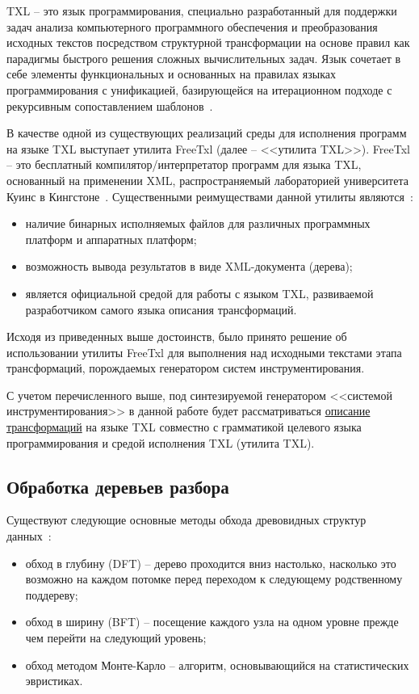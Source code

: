 TXL -- это язык программирования, специально разработанный для поддержки задач анализа компьютерного программного обеспечения и преобразования исходных текстов посредством структурной трансформации на основе правил как парадигмы быстрого решения сложных вычислительных задач.
Язык сочетает в себе элементы функциональных и основанных на правилах языках программирования с унификацией, базирующейся на итерационном  подходе с рекурсивным сопоставлением шаблонов~\cite{txl-about}.

В качестве одной из существующих реализаций среды для исполнения программ на языке TXL выступает утилита FreeTxl (далее -- <<утилита TXL>>).
FreeTxl -- это бесплатный компилятор/интерпретатор программ для языка TXL, основанный на применении XML, распространяемый лабораторией университета Куинс в Кингстоне~\cite{txl-freetxl}.
Существенными реимуществами данной утилиты являются~\cite{txl-freetxl}:
\begin{itemize}[noitemsep]
  \item наличие бинарных исполняемых файлов для различных программных платформ и аппаратных платформ;
  \item возможность вывода результатов в виде XML-документа (дерева);
  \item является официальной средой для работы с языком TXL, развиваемой разработчиком самого языка описания трансформаций.
\end{itemize}

Исходя из приведенных выше достоинств, было принято решение об использовании утилиты FreeTxl для выполнения над исходными текстами этапа трансформаций, порождаемых генератором систем инструментирования.

С учетом перечисленного выше, под синтезируемой генератором <<системой инструментирования>> в данной работе будет рассматриваться \underline{описание трансформаций} на языке TXL совместно с грамматикой целевого языка программирования и средой исполнения TXL (утилита TXL).

\subsection{Обработка деревьев разбора}

Существуют следующие основные методы обхода древовидных структур данных~\cite{cormen2009introduction}:
\begin{itemize}[noitemsep]
  \item обход в глубину (DFT) -- дерево проходится вниз настолько, насколько это возможно на каждом потомке перед переходом к следующему родственному поддереву;
  \item обход в ширину (BFT) -- посещение каждого узла на одном уровне прежде чем перейти на следующий уровень;
  \item обход методом Монте-Карло -- алгоритм, основывающийся на статистических эвристиках.
\end{itemize}


